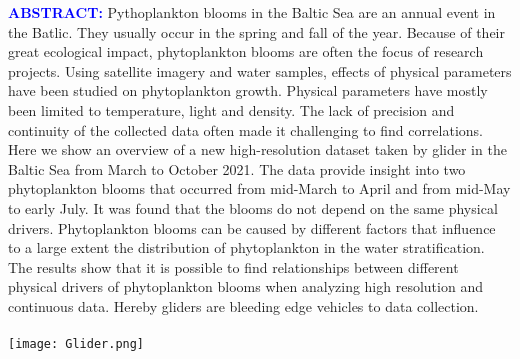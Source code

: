 \documentclass[../Main.tex]{subfiles}
\begin{document}
\begin{tcolorbox}[colback=light-orange, boxrule=0pt]
  \begin{multicols}{3}
    \textcolor{blue}{\textbf{ABSTRACT:}}
Pythoplankton blooms in the Baltic Sea are an annual event in the Batlic. They usually occur in the spring and fall of the year.
    Because of their great ecological impact, phytoplankton blooms are often the focus of research projects. Using satellite imagery and water samples, effects of physical parameters have been studied on phytoplankton growth. Physical parameters have mostly been limited to temperature, light and density.
The lack of precision and continuity of the collected data often made it challenging to find correlations.
   Here we show an overview of a new high-resolution dataset taken by glider in the Baltic Sea from March to October 2021.
    The data provide insight into two phytoplankton blooms that occurred from mid-March to April and from mid-May to early July.
It was found that the blooms do not depend on the same physical drivers. 
Phytoplankton blooms can be caused by different factors that influence to a large extent the distribution of phytoplankton in the water stratification. 
   The results show that it is possible to find relationships between different physical drivers of phytoplankton blooms when analyzing high resolution and continuous data. Hereby gliders are bleeding edge vehicles to data collection.
\ \\
\ \\
    \texttt{[image: Glider.png]}
 \end{multicols}
\end{tcolorbox}
\end{document}
